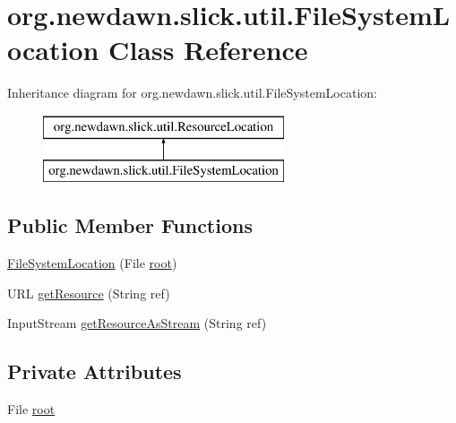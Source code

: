 \hypertarget{classorg_1_1newdawn_1_1slick_1_1util_1_1_file_system_location}{}\section{org.\+newdawn.\+slick.\+util.\+File\+System\+Location Class Reference}
\label{classorg_1_1newdawn_1_1slick_1_1util_1_1_file_system_location}
Inheritance diagram for org.\+newdawn.\+slick.\+util.\+File\+System\+Location\+:\begin{figure}[H]
\begin{center}
\leavevmode
\includegraphics[height=2.000000cm]{classorg_1_1newdawn_1_1slick_1_1util_1_1_file_system_location}
\end{center}
\end{figure}
\subsection*{Public Member Functions}
\begin{DoxyCompactItemize}
\item 
\mbox{\hyperlink{classorg_1_1newdawn_1_1slick_1_1util_1_1_file_system_location_aa21c8d2fe37743d92736667a8efc98da}{File\+System\+Location}} (File \mbox{\hyperlink{classorg_1_1newdawn_1_1slick_1_1util_1_1_file_system_location_a63b136315b940762412adc61596fb6cf}{root}})
\item 
U\+RL \mbox{\hyperlink{classorg_1_1newdawn_1_1slick_1_1util_1_1_file_system_location_ad667c6a3c97a76caf89ffa816904033a}{get\+Resource}} (String ref)
\item 
Input\+Stream \mbox{\hyperlink{classorg_1_1newdawn_1_1slick_1_1util_1_1_file_system_location_a01200401dca18c8a89c2e866abcc48a3}{get\+Resource\+As\+Stream}} (String ref)
\end{DoxyCompactItemize}
\subsection*{Private Attributes}
\begin{DoxyCompactItemize}
\item 
File \mbox{\hyperlink{classorg_1_1newdawn_1_1slick_1_1util_1_1_file_system_location_a63b136315b940762412adc61596fb6cf}{root}}
\end{DoxyCompactItemize}


